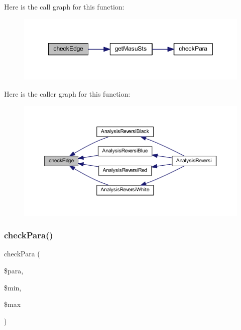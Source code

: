 Here is the call graph for this function\+:
\nopagebreak
\begin{figure}[H]
\begin{center}
\leavevmode
\includegraphics[width=349pt]{class_reversi_acd2c64ea43cc26407ad64920a183446b_cgraph}
\end{center}
\end{figure}
Here is the caller graph for this function\+:
\nopagebreak
\begin{figure}[H]
\begin{center}
\leavevmode
\includegraphics[width=350pt]{class_reversi_acd2c64ea43cc26407ad64920a183446b_icgraph}
\end{center}
\end{figure}
\mbox{\label{class_reversi_ac8d57b64bc839c8bb1f53a2a5db11228}} 
\subsubsection{\texorpdfstring{check\+Para()}{checkPara()}}
{\footnotesize\ttfamily check\+Para (\begin{DoxyParamCaption}\item[{}]{\$para,  }\item[{}]{\$min,  }\item[{}]{\$max }\end{DoxyParamCaption})\hspace{0.3cm}{\ttfamily [private]}}



